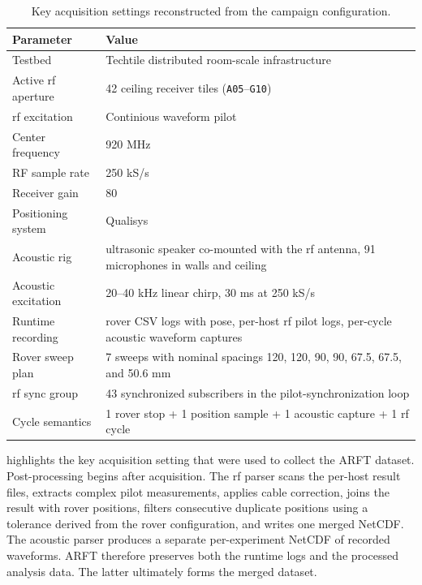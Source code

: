 \begin{table}[t]
    \centering
    \caption{Key acquisition settings reconstructed from the campaign configuration.}
    \label{tab:config}
    \setlength{\tabcolsep}{4pt}
    \begin{tabular}{p{}p{}}
        \toprule
        Parameter & Value \\
        \midrule
        Testbed & Techtile distributed room-scale infrastructure \\
        Active \gls{rf} aperture & 42 ceiling receiver tiles (\texttt{A05}--\texttt{G10}) \\
        \gls{rf} excitation & Continious waveform pilot \\
        Center frequency & 920 MHz \\
        RF sample rate & 250 kS/s \\
        Receiver gain & 80 \\
        Positioning system & Qualisys \\
        Acoustic rig & ultrasonic speaker co-mounted with the \gls{rf} antenna, 91 microphones in walls and ceiling \\
        Acoustic excitation & 20--40 kHz linear chirp, 30 ms at 250 kS/s \\
        Runtime recording & rover CSV logs with pose, per-host \gls{rf} pilot logs, per-cycle acoustic waveform captures \\
        Rover sweep plan & 7 sweeps with nominal spacings 120, 120, 90, 90, 67.5, 67.5, and 50.6 mm\\
        \gls{rf} sync group & 43 synchronized subscribers in the pilot-synchronization loop \\
        Cycle semantics & 1 rover stop + 1 position sample + 1 acoustic capture + 1 \gls{rf} cycle \\
        \bottomrule
    \end{tabular}
\end{table}

 highlights the key acquisition setting that were used to collect the ARFT dataset. Post-processing begins after acquisition. The \gls{rf} parser scans the per-host result files, extracts complex pilot measurements, applies cable correction, joins the result with rover positions, filters consecutive duplicate positions using a tolerance derived from the rover configuration, and writes one merged NetCDF. The acoustic parser produces a separate per-experiment NetCDF of recorded waveforms. ARFT therefore preserves both the runtime logs and the processed analysis data. The latter ultimately forms the merged dataset.
